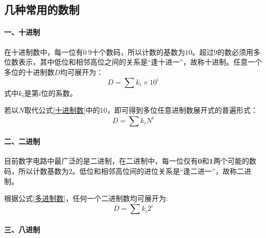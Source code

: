 \subsection{几种常用的数制}

\paragraph{一、十进制}
在十进制数中，每一位有$ 0~9 $十个数码，所以计数的基数为$ 10 $。超过$ 9 $的数必须用多位数表示，其中低位和相邻高位之间的关系是“逢十进一”，故称十进制。任意一个多位的十进制数$ D $均可展开为：
\begin{equation}
    D = \sum k_{i} \times 10^{i}
    \label{十进制数}
\end{equation}
式中$ k_{i} $是第$ i $位的系数。

若以$ N $取代公式\ref{十进制数}中的$ 10 $，即可得到多位任意进制数展开式的普遍形式：
\begin{equation}
    D = \sum k_{i} N^{i}
    \label{多进制数}
\end{equation}

\paragraph{二、二进制}
目前数字电路中最广泛的是二进制，在二进制中，每一位仅有$ \mathbf{0} $和$ \mathbf{1} $两个可能的数码，所以计数基数为$ 2 $。低位和相邻高位间的进位关系是“逢二进一”，故称二进制。

根据公式\ref{多进制数}，任何一个二进制数均可展开为:
\begin{equation}
    D = \sum k_{i}2^{i}
\end{equation}

\paragraph{三、八进制}
